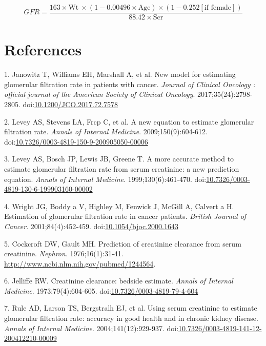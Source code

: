 \documentclass[11pt,]{article}
\begin{document}
\begin{equation*}
GFR = \frac{163\times \mathrm{Wt}\ \times(1-0.00496\times \mathrm{Age})\times(1-0.252[\text{if female}])}{88.42\times \mathrm{Scr}}
\end{equation*}

\section*{References}\label{references}

\hypertarget{refs}{}
\hypertarget{ref-Janowitz2017a}{}
1. Janowitz T, Williams EH, Marshall A, et al. New model for estimating
glomerular filtration rate in patients with cancer. \emph{Journal of
Clinical Oncology : official journal of the American Society of Clinical
Oncology}. 2017;35(24):2798-2805.
doi:\href{https://doi.org/10.1200/JCO.2017.72.7578}{10.1200/JCO.2017.72.7578}

\hypertarget{ref-Levey2009}{}
2. Levey AS, Stevens LA, Frcp C, et al. A new equation to estimate
glomerular filtration rate. \emph{Annals of Internal Medicine}.
2009;150(9):604-612.
doi:\href{https://doi.org/10.7326/0003-4819-150-9-200905050-00006}{10.7326/0003-4819-150-9-200905050-00006}

\hypertarget{ref-Levey2016}{}
3. Levey AS, Bosch JP, Lewis JB, Greene T. A more accurate method to
estimate glomerular filtration rate from serum creatinine: a new
prediction equation. \emph{Annals of Internal Medicine}.
1999;130(6):461-470.
doi:\href{https://doi.org/10.7326/0003-4819-130-6-199903160-00002}{10.7326/0003-4819-130-6-199903160-00002}

\hypertarget{ref-Wright2001a}{}
4. Wright JG, Boddy a V, Highley M, Fenwick J, McGill A, Calvert a H.
Estimation of glomerular filtration rate in cancer patients.
\emph{British Journal of Cancer}. 2001;84(4):452-459.
doi:\href{https://doi.org/10.1054/bjoc.2000.1643}{10.1054/bjoc.2000.1643}

\hypertarget{ref-Cockcroft1976}{}
5. Cockcroft DW, Gault MH. Prediction of creatinine clearance from serum
creatinine. \emph{Nephron}. 1976;16(1):31-41.
\url{http://www.ncbi.nlm.nih.gov/pubmed/1244564}.

\hypertarget{ref-Jelliffe1973}{}
6. Jelliffe RW. Creatinine clearance: bedside estimate. \emph{Annals of
Internal Medicine}. 1973;79(4):604-605.
doi:\href{https://doi.org/10.7326/0003-4819-79-4-604}{10.7326/0003-4819-79-4-604}

\hypertarget{ref-Rule2004}{}
7. Rule AD, Larson TS, Bergstralh EJ, et al. Using serum creatinine to
estimate glomerular filtration rate: accuracy in good health and in
chronic kidney disease. \emph{Annals of Internal Medicine}.
2004;141(12):929-937.
doi:\href{https://doi.org/10.7326/0003-4819-141-12-200412210-00009}{10.7326/0003-4819-141-12-200412210-00009}
\end{document}
